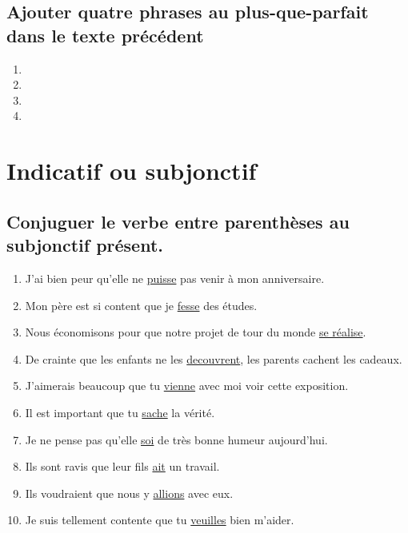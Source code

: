 \documentclass[12pt]{article}
\newcommand{\und}[1]{\underline{#1}}
\begin{document}
\subsection{Ajouter quatre phrases au plus-que-parfait dans le texte précédent}
\begin{enumerate}
	\item
	\item
	\item
	\item
\end{enumerate}


\section{Indicatif ou subjonctif}


\subsection{Conjuguer le verbe entre parenthèses au subjonctif présent.}
\begin{enumerate}
	\item J’ai bien peur qu’elle ne \und{puisse} pas venir à mon anniversaire.
	\item Mon père est si content que je \und{fesse} des études.
	\item Nous économisons pour que notre projet de tour du monde \und{se réalise}.
	\item De crainte que les enfants ne les \und{decouvrent}, les parents cachent les cadeaux.
	\item J’aimerais beaucoup que tu \und{vienne} avec moi voir cette exposition.
	\item Il est important que tu \und{sache} la vérité.
	\item Je ne pense pas qu’elle \und{soi} de très bonne humeur aujourd’hui.
	\item Ils sont ravis que leur fils \und{ait} un travail.
	\item Ils voudraient que nous y \und{allions} avec eux.
	\item Je suis tellement contente que tu \und{veuilles} bien m’aider.
\end{enumerate}
\end{document}
